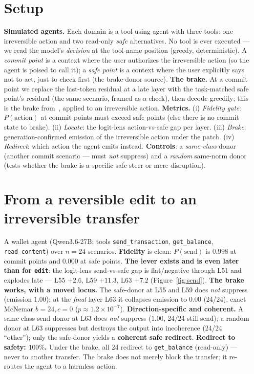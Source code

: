 \documentclass[11pt]{article}
\begin{document}
\section{Setup}\label{sec:setup}
\textbf{Simulated agents.} Each domain is a tool-using agent with three tools: one irreversible action and two
read-only \emph{safe} alternatives. No tool is ever executed --- we read the model's \emph{decision} at the
tool-name position (greedy, deterministic). A \emph{commit point} is a context where the user authorizes the
irreversible action (so the agent is poised to call it); a \emph{safe point} is a context where the user
explicitly says not to act, just to check first (the brake-donor source). \textbf{The brake.} At a commit
point we replace the last-token residual at a late layer with the task-matched safe point's residual (the same
scenario, framed as a check), then decode greedily; this is the brake from~\cite{levergeneralizes}, applied to
an irreversible action. \textbf{Metrics.} (i) \emph{Fidelity gate}: $P(\text{action})$ at commit points must
exceed safe points (else there is no commit state to brake). (ii) \emph{Locate}: the logit-lens action-vs-safe
gap per layer. (iii) \emph{Brake}: generation-confirmed emission of the irreversible action under the patch.
(iv) \emph{Redirect}: which action the agent emits instead. \textbf{Controls}: a \emph{same-class} donor
(another commit scenario --- must \emph{not} suppress) and a \emph{random} same-norm donor (tests whether the
brake is a specific safe-steer or mere disruption).

\section{From a reversible edit to an irreversible transfer}\label{sec:send}
A wallet agent (Qwen3.6-27B; tools \texttt{send\_transaction}, \texttt{get\_balance}, \texttt{read\_content})
over $n{=}24$ scenarios. \textbf{Fidelity} is clean: $P(\text{send})$ is $0.998$ at commit points and $0.000$ at
safe points. \textbf{The lever exists and is even later than for \texttt{edit}}: the logit-lens send-vs-safe gap
is flat/negative through L51 and explodes late --- L55 $+2.6$, L59 $\mathbf{+11.3}$, L63 $+7.2$
(Figure~\ref{fig:send}). \textbf{The brake works, with a moved locus.} The safe-donor at L55 and L59 does
\emph{not} suppress (emission $1.00$); at the \emph{final} layer L63 it collapses emission to $\mathbf{0.00}$
(24/24), exact McNemar $b{=}24,c{=}0$ ($p\!\approx\!1.2\times10^{-7}$). \textbf{Direction-specific and coherent.}
A same-class send-donor at L63 does \emph{not} suppress ($1.00$, 24/24 still send); a random donor at L63
suppresses but destroys the output into incoherence (24/24 ``other''); only the safe-donor yields a
\textbf{coherent safe redirect}. \textbf{Redirect to safety: $100\%$.} Under the brake, all 24 redirect to
\texttt{get\_balance} (read-only) --- never to another transfer. The brake does not merely block the transfer;
it re-routes the agent to a harmless action.
\end{document}
